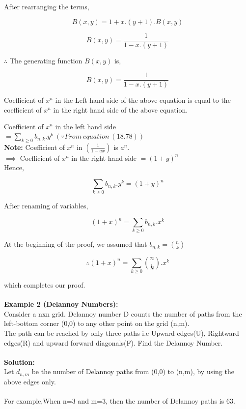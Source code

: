 After rearranging the terms,

$$B(x,y) = 1+x.\left(y+1\right).B(x,y)$$

$$B(x,y) = \frac{1}{1-x.\left(y+1\right)}$$

$\therefore$ The generating function $B(x,y)$ is,

\begin{equation}
	\boxed{B(x,y) = \frac{1}{1-x.\left(y+1\right)}}
\end{equation}

Coefficient of $x^n$ in the Left hand side of the above equation is equal to the coefficient of $x^n$ in the right hand side of the above equation.

Coefficient of $x^n$ in the left hand side $= \sum_{k \geq 0}b_{n,k}.y^k~(\because From~equation~(18.78))$ 
\\

\textbf{Note:} Coefficient of $x^n$ in $\left(\frac{1}{1-ax}\right)$ is $a^n$.\\

$\implies$ Coefficient of $x^n$ in the right hand side $= {\left(1+y \right)}^{n}$\\

Hence,

$$\sum_{k \geq 0}b_{n,k}.y^k = {\left(1+y \right)}^{n} $$

After renaming of variables,

$${\left(1+x \right)}^{n} = \sum_{k \geq 0}b_{n,k}.x^k $$

At the beginning of the proof, we assumed that $b_{n,k} = {n \choose k}$

\begin{equation}
	\boxed{\therefore {\left(1+x \right)}^{n} = \sum_{k \geq 0}{n \choose k}.x^k}
\end{equation}

which completes our proof.
\\ \\
\textbf{Example 2 (Delannoy Numbers):}\\
Consider a nxn grid. Delannoy number D counts the number of paths from the left-bottom corner (0,0) to any other point on the grid (n,m). \\
The path can be reached by only three paths i.e Upward edges(U), Rightward edges(R) and upward forward diagonals(F). Find the Delannoy Number. \\ \\
\textbf{Solution:}\\
Let $d_{n,m}$ be the number of Delannoy paths from (0,0) to (n,m), by using the above edges only.
\\ \\
For example,When n=3 and m=3, then the number of Delannoy paths is 63.

